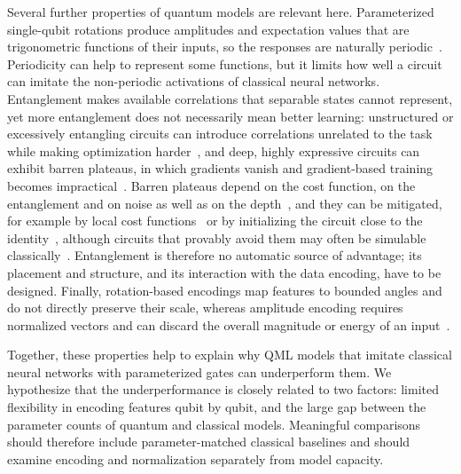 \documentclass[11pt]{article}
\begin{document}
Several further properties of quantum models are relevant here. Parameterized single-qubit rotations produce amplitudes and expectation values that are trigonometric functions of their inputs, so the responses are naturally periodic~\cite{daskin2018simple,schuld2021mlqc}. Periodicity can help to represent some functions, but it limits how well a circuit can imitate the non-periodic activations of classical neural networks. Entanglement makes available correlations that separable states cannot represent, yet more entanglement does not necessarily mean better learning: unstructured or excessively entangling circuits can introduce correlations unrelated to the task while making optimization harder~\cite{mcclean2018barren,holmes2022connecting}, and deep, highly expressive circuits can exhibit barren plateaus, in which gradients vanish and gradient-based training becomes impractical~\cite{mcclean2018barren,cerezo2021vqa}. Barren plateaus depend on the cost function, on the entanglement and on noise as well as on the depth~\cite{cerezo2021costbp,ortizmarrero2021entanglementbp,wang2020noise,larocca2022diagnosing}, and they can be mitigated, for example by local cost functions~\cite{cerezo2021costbp} or by initializing the circuit close to the identity~\cite{grant2019initialization}, although circuits that provably avoid them may often be simulable classically~\cite{cerezo2025simulability}. Entanglement is therefore no automatic source of advantage; its placement and structure, and its interaction with the data encoding, have to be designed. Finally, rotation-based encodings map features to bounded angles and do not directly preserve their scale, whereas amplitude encoding requires normalized vectors and can discard the overall magnitude or energy of an input~\cite{schuld2021effect}.

Together, these properties help to explain why QML models that imitate classical neural networks with parameterized gates can underperform them. We hypothesize that the underperformance is closely related to two factors: limited flexibility in encoding features qubit by qubit, and the large gap between the parameter counts of quantum and classical models. Meaningful comparisons should therefore include parameter-matched classical baselines and should examine encoding and normalization separately from model capacity.
\end{document}
